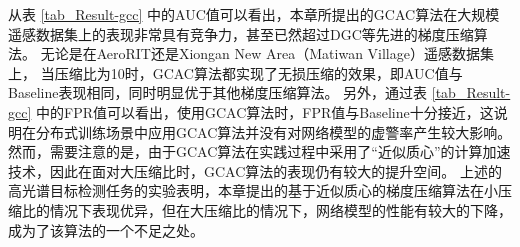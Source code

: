 \documentclass{xdupgthesis}
\begin{document}
从表 \ref{tab_Result-gcc} 中的AUC值可以看出，本章所提出的GCAC算法在大规模遥感数据集上的表现非常具有竞争力，甚至已然超过DGC等先进的梯度压缩算法。
无论是在AeroRIT还是Xiongan New Area（Matiwan Village）遥感数据集上，
当压缩比为10时，GCAC算法都实现了无损压缩的效果，即AUC值与Baseline表现相同，同时明显优于其他梯度压缩算法。
另外，通过表 \ref{tab_Result-gcc} 中的FPR值可以看出，使用GCAC算法时，FPR值与Baseline十分接近，这说明在分布式训练场景中应用GCAC算法并没有对网络模型的虚警率产生较大影响。
然而，需要注意的是，由于GCAC算法在实践过程中采用了“近似质心”的计算加速技术，因此在面对大压缩比时，GCAC算法的表现仍有较大的提升空间。
上述的高光谱目标检测任务的实验表明，本章提出的基于近似质心的梯度压缩算法在小压缩比的情况下表现优异，但在大压缩比的情况下，网络模型的性能有较大的下降，成为了该算法的一个不足之处。

\end{document}
